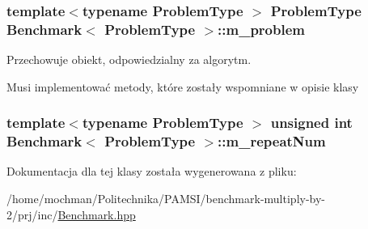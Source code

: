 \hypertarget{class_benchmark_a3757139b2e5a299b831471e0d43f5f6b}{
\subsubsection[{m\-\_\-problem}]{\setlength{\rightskip}{0pt plus 5cm}template$<$typename Problem\-Type $>$ Problem\-Type {\bf Benchmark}$<$ Problem\-Type $>$\-::m\-\_\-problem\hspace{0.3cm}{\ttfamily [private]}}}\label{class_benchmark_a3757139b2e5a299b831471e0d43f5f6b}


Przechowuje obiekt, odpowiedzialny za algorytm. 

Musi implementować metody, które zostały wspomniane w opisie klasy \hypertarget{class_benchmark_ad2c6e23af9c3a8c8592bbeabeb6e1a6d}{
\subsubsection[{m\-\_\-repeat\-Num}]{\setlength{\rightskip}{0pt plus 5cm}template$<$typename Problem\-Type $>$ unsigned int {\bf Benchmark}$<$ Problem\-Type $>$\-::m\-\_\-repeat\-Num\hspace{0.3cm}{\ttfamily [private]}}}\label{class_benchmark_ad2c6e23af9c3a8c8592bbeabeb6e1a6d}


Dokumentacja dla tej klasy została wygenerowana z pliku\-:\begin{DoxyCompactItemize}
\item 
/home/mochman/\-Politechnika/\-P\-A\-M\-S\-I/benchmark-\/multiply-\/by-\/2/prj/inc/\hyperlink{_benchmark_8hpp}{Benchmark.\-hpp}\end{DoxyCompactItemize}
